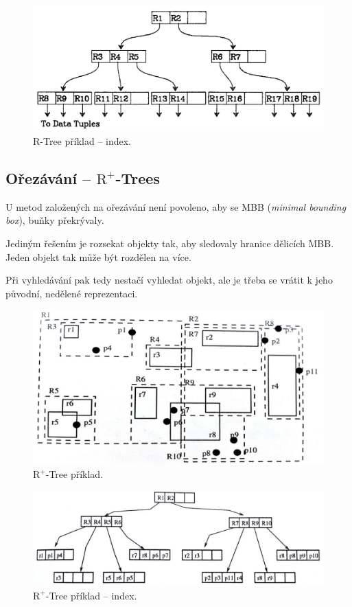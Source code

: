 \begin{figure}[H]
    \centering
    \includegraphics[width=0.85\linewidth]{r_tree_2.pdf}
    \caption{R-Tree příklad -- index.}
\end{figure}

\subsection{Ořezávání -- $\text{R}^+$-Trees}

\begin{compactitem}
    \item U metod založených na ořezávání není povoleno, aby se MBB (\textit{minimal bounding box}), buňky překrývaly.
    \item Jediným řešením je rozsekat objekty tak, aby sledovaly hranice dělicích MBB. Jeden objekt tak může být rozdělen na více.
    \item Při vyhledávání pak tedy nestačí vyhledat objekt, ale je třeba se vrátit k jeho původní, nedělené reprezentaci.
\end{compactitem}

\begin{figure}[H]
    \centering
    \includegraphics[width=0.85\linewidth]{r_tree_plus_1.pdf}
    \caption{$\text{R}^+$-Tree příklad.}
\end{figure}

\begin{figure}[H]
    \centering
    \includegraphics[width=1\linewidth]{r_tree_plus_2.pdf}
    \caption{$\text{R}^+$-Tree příklad -- index.}
\end{figure}
